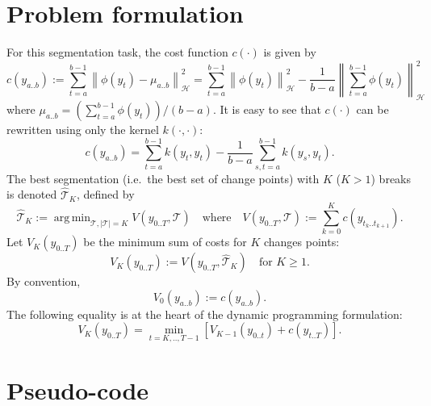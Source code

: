 \documentclass[12pt]{article}
\newcommand\HH{\mathcal{H}}
\newcommand{\norm}[1]{\left\lVert#1\right\rVert}
\newcommand{\TT}{\mathcal{T}}
\newcommand{\TThat}{\widehat{\mathcal{T}}}
\DeclareMathOperator*{\argmin}{arg\,min}
\begin{document}
\section{Problem formulation}
For this segmentation task, the cost function $c(\cdot)$ is given by
\begin{equation}
    c(y_{a..b}) := \sum_{t=a}^{b-1} \norm{\phi(y_t) - \mu_{a..b}}_{\HH}^2 = \sum_{t=a}^{b-1} \norm{\phi(y_t)}_{\HH}^2 - \frac{1}{b-a}\norm{\sum_{t=a}^{b-1} \phi(y_t)}^2_\HH
\end{equation}
where $\mu_{a..b} = (\sum_{t=a}^{b-1} \phi(y_t))/(b-a)$.
It is easy to see that $c(\cdot)$ can be rewritten using only the kernel $k(\cdot, \cdot)$:
\begin{equation}
    c(y_{a..b}) = \sum_{t=a}^{b-1} k(y_t, y_t) - \frac{1}{b-a} \sum_{s,t=a}^{b-1} k(y_s,y_t).
\end{equation}
The best segmentation (i.e.\ the best set of change points) with $K$ ($K>1$) breaks is denoted $\TThat_K$, defined by 
\begin{equation}
    \TThat_K := \argmin_{\TT, |\TT|=K} V(y_{0..T}, \TT)\quad\text{where}\quad V(y_{0..T}, \TT):= \sum_{k=0}^{K} c(y_{t_k..t_{k+1}}).
    \label{eq:min-sum-of-cost}
\end{equation}
Let $V_K(y_{0..T})$ be the minimum sum of costs for $K$ changes points:
\begin{equation}
    V_K(y_{0..T}) := V(y_{0..T}, \TThat_K) \quad\text{for } K\geq1.
\end{equation}
By convention,
\begin{equation}
    V_0(y_{a..b}) := c(y_{a..b}).
\end{equation}
The following equality is at the heart of the dynamic programming formulation:
\begin{equation}
    V_K(y_{0..T}) = \min_{t=K,..,T-1} \left[V_{K-1}(y_{0..t}) + c(y_{t..T})\right].
\end{equation}

\section{Pseudo-code}
\end{document}
